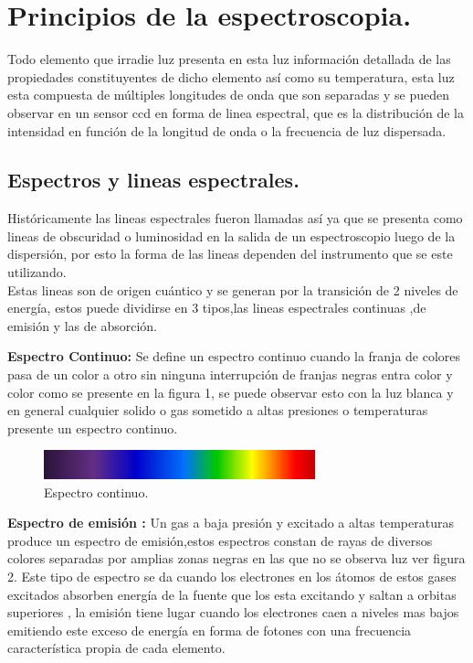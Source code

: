 \section {Principios de la espectroscopia.}
Todo elemento que  irradie luz presenta en esta luz información detallada de las propiedades constituyentes de dicho elemento así como su temperatura, esta luz esta compuesta de múltiples longitudes de onda que son separadas y se pueden observar en un sensor ccd en forma de linea espectral, que es la distribución de  la intensidad en función de la longitud de onda o la frecuencia  de luz dispersada.

\subsection {Espectros y lineas espectrales.}

Históricamente las lineas espectrales fueron llamadas así ya que se  presenta como lineas de obscuridad o luminosidad en la salida de un espectroscopio luego de la dispersión, por esto la forma de las lineas dependen del instrumento que se este utilizando.\\
Estas lineas son de origen cuántico y se generan por la transición de 2 niveles de energía, estos puede dividirse en 3 tipos,las lineas espectrales continuas ,de emisión y las de absorción.\cite{troccoli}


\textbf{Espectro Continuo:}
Se define un espectro continuo cuando la franja de colores  pasa de un color a otro sin ninguna interrupción de franjas negras entra color y color como se presente en la figura 1, se puede observar esto con la luz blanca y en general cualquier solido o gas sometido a altas presiones o temperaturas presente un espectro continuo.


\begin{figure}[htb!]
\centering
\includegraphics[width=0.7\textwidth]{images/1.png}
\caption[Espectro continuo.]{Espectro continuo.\cite{libro}}
 \label{fig2}
\end{figure}

\textbf{Espectro de emisión :} Un gas a baja presión y excitado a altas temperaturas produce un espectro de emisión,estos espectros constan de rayas de diversos colores separadas por amplias zonas  negras en las que no se observa luz ver figura 2. Este tipo de espectro se da cuando los electrones en los átomos de estos gases excitados absorben energía de la fuente que los esta excitando  y saltan a orbitas superiores , la emisión tiene lugar cuando los electrones caen a niveles mas bajos emitiendo este exceso de energía en forma de fotones con una frecuencia característica propia de cada elemento.


